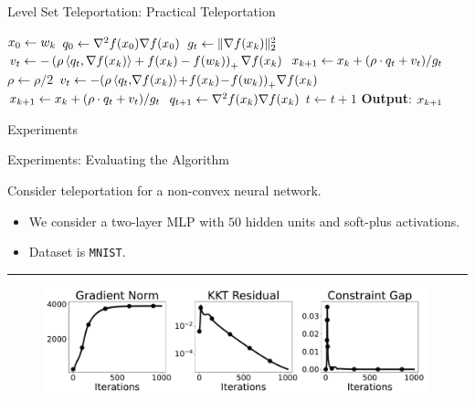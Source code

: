 \documentclass[usenames,dvipsnames,mathserif,notheorems]{beamer}
\newcommand{\horizontalrule}{
	{
			\vspace{-0.5em}
			\center \rule{\textwidth}{0.1em}
			\vspace{-0.2em}
		}
}
\newcommand{\bad}[1]{\textcolor{bad}{#1}}
\begin{document}
\begin{frame}{Level Set Teleportation: Practical Teleportation}

    \begin{algorithm}[H]
        \caption{Sub-level Set Teleportation}
        \label{alg:teleport}
        \begin{algorithmic}
            \STATE \( x_0 \gets w_k \)
            \STATE \( q_0 \gets \nabla^2 f(x_0) \nabla f(x_0) \)
            \STATE \( g_t \gets \|\nabla f(x_k)\|_2^2 \)
            \STATE \( v_{t} \gets - \left(\rho \left\langle q_t, \nabla f(x_k) \right\rangle + f(x_k) - f(w_k)\right)_+ \nabla f(x_k) \)
            \STATE \( x_{k+1} \gets x_k + (\rho \cdot q_t + v_t) / g_t \)
            \STATE \( \rho \gets \rho / 2 \)
            \STATE \( v_{t} \gets -\! \left(\rho \left\langle q_t, \!\nabla f(x_k) \right\rangle \!+\! f(x_k) \!-\! f(w_k)\right)_+ \!\nabla f(x_k) \)
            \STATE \( x_{k+1} \gets x_k + (\rho \cdot q_t + v_t) / g_t \)
            \ENDWHILE
            \STATE \( q_{t+1} \gets \nabla^2 f(x_k) \nabla f(x_k) \)
            \STATE \( t \gets t+1 \)
            \ENDWHILE
            \STATE \textbf{Output}: \( x_{k+1} \)
        \end{algorithmic}
    \end{algorithm}
\end{frame}

\begin{frame}{}
    \begin{center}
        \huge Experiments
    \end{center}
\end{frame}

\begin{frame}{Experiments: Evaluating the Algorithm}

    Consider teleportation for a \bad{non-convex} neural network.
    \begin{itemize}
        \pause
        \item We consider a two-layer MLP with \( 50 \) hidden units and soft-plus activations.
              \pause
        \item Dataset is \texttt{MNIST}.
    \end{itemize}
    \pause
    \horizontalrule

    \begin{figure}
        \centering
        \includegraphics[width=0.99\textwidth]{assets/teleport_metrics.pdf}
    \end{figure}

\end{frame}
\end{document}
